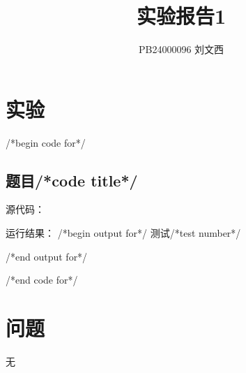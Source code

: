 \documentclass{ctexart}
\title{实验报告1}
\author{PB24000096 刘文西}
\begin{document}
\maketitle
\section{实验}

/*begin code for*/
\subsection{题目/*code title*/}
源代码：


运行结果：
/*begin output for*/
测试/*test number*/

/*end output for*/

/*end code for*/
\section{问题}
无
\end{document}
